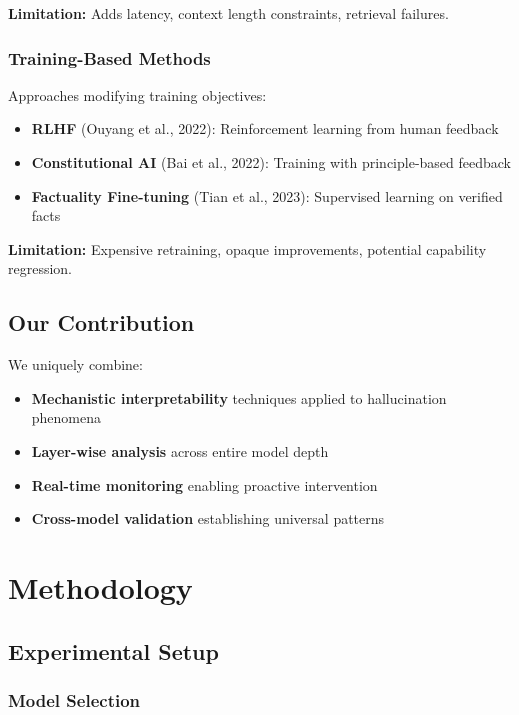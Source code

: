 \documentclass[11pt]{article}
\begin{document}
\textbf{Limitation:} Adds latency, context length constraints, retrieval failures.

\subsubsection{Training-Based Methods}

Approaches modifying training objectives:

\begin{itemize}
    \item \textbf{RLHF} (Ouyang et al., 2022): Reinforcement learning from human feedback
    \item \textbf{Constitutional AI} (Bai et al., 2022): Training with principle-based feedback
    \item \textbf{Factuality Fine-tuning} (Tian et al., 2023): Supervised learning on verified facts
\end{itemize}

\textbf{Limitation:} Expensive retraining, opaque improvements, potential capability regression.

\subsection{Our Contribution}

We uniquely combine:
\begin{itemize}
    \item \textbf{Mechanistic interpretability} techniques applied to hallucination phenomena
    \item \textbf{Layer-wise analysis} across entire model depth
    \item \textbf{Real-time monitoring} enabling proactive intervention
    \item \textbf{Cross-model validation} establishing universal patterns
\end{itemize}

\section{Methodology}

\subsection{Experimental Setup}

\subsubsection{Model Selection}
\end{document}
